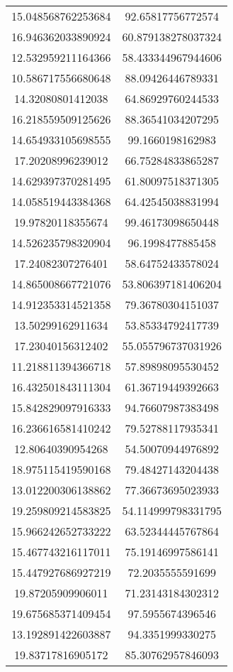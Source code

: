 \begin{table}
\begin{tabular}{cc}
15.048568762253684 & 92.65817756772574 \\
16.946362033890924 & 60.879138278037324 \\
12.532959211164366 & 58.433344967944606 \\
10.586717556680648 & 88.09426446789331 \\
14.32080801412038 & 64.86929760244533 \\
16.218559509125626 & 88.36541034207295 \\
14.654933105698555 & 99.1660198162983 \\
17.20208996239012 & 66.75284833865287 \\
14.629397370281495 & 61.80097518371305 \\
14.058519443384368 & 64.42545038831994 \\
19.97820118355674 & 99.46173098650448 \\
14.526235798320904 & 96.1998477885458 \\
17.24082307276401 & 58.64752433578024 \\
14.865008667721076 & 53.806397181406204 \\
14.912353314521358 & 79.36780304151037 \\
13.50299162911634 & 53.85334792417739 \\
17.23040156312402 & 55.055796737031926 \\
11.218811394366718 & 57.89898095530452 \\
16.432501843111304 & 61.36719449392663 \\
15.842829097916333 & 94.76607987383498 \\
16.236616581410242 & 79.52788117935341 \\
12.80640390954268 & 54.50070944976892 \\
18.975115419590168 & 79.48427143204438 \\
13.012200306138862 & 77.36673695023933 \\
19.259809214583825 & 54.114999798331795 \\
15.966242652733222 & 63.52344445767864 \\
15.467743216117011 & 75.19146997586141 \\
15.447927686927219 & 72.2035555591699 \\
19.87205909906011 & 71.23143184302312 \\
19.675685371409454 & 97.5955674396546 \\
13.192891422603887 & 94.3351999330275 \\
19.83717816905172 & 85.30762957846093 \\

\end{tabular}
\end{table}
